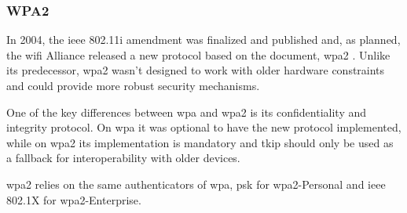 \subsubsection{WPA2}

In 2004, the \gls{ieee} 802.11i amendment was finalized and published and, as planned, the \gls{wifi} Alliance released a new protocol based on the document, \gls{wpa}2 \cite{wifi_state}. Unlike its predecessor, \gls{wpa}2 wasn’t designed to work with older hardware constraints and could provide more robust security mechanisms.

One of the key differences between \gls{wpa} and \gls{wpa}2 is its confidentiality and integrity protocol. On \gls{wpa} it was optional to have the new protocol implemented, while on \gls{wpa}2 its implementation is mandatory and \gls{tkip} should only be used as a fallback for interoperability with older devices.

\gls{wpa}2 relies on the same authenticators of \gls{wpa}, \gls{psk} for \gls{wpa}2-Personal and \gls{ieee} 802.1X for \gls{wpa}2-Enterprise.




